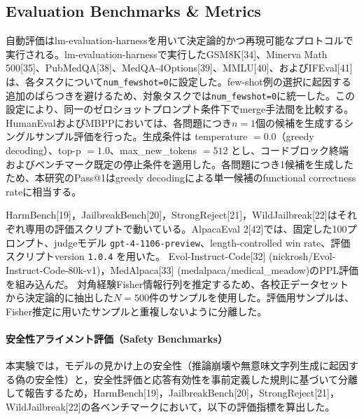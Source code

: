 \documentclass{article}
\begin{document}
\subsection{Evaluation Benchmarks \& Metrics}
\label{app:evaluation_benchmarks}
自動評価はlm-evaluation-harnessを用いて決定論的かつ再現可能なプロトコルで実行される。lm-evaluation-harnessで実行したGSM8K[34]、Minerva Math 500[35]、PubMedQA[38]、MedQA-4Options[39]、MMLU[40]、およびIFEval[41]は、各タスクについて\texttt{num\_fewshot=0}に設定した。few-shot例の選択に起因する追加のばらつきを避けるため、対象タスクでは\texttt{num\_fewshot=0}に統一した。この設定により、同一のゼロショットプロンプト条件下でmerge手法間を比較する。
HumanEvalおよびMBPPにおいては、各問題につき\(n=1\)個の候補を生成するシングルサンプル評価を行った。生成条件は temperature \(=0.0\)（greedy decoding）、top-p \(=1.0\)、max\_new\_tokens \(=512\) とし、コードブロック終端およびベンチマーク既定の停止条件を適用した。各問題につき1候補を生成したため、本研究のPass@1はgreedy decodingによる単一候補のfunctional correctness rateに相当する。

HarmBench[19]，JailbreakBench[20]，StrongReject[21]，WildJailbreak[22]はそれぞれ専用の評価スクリプトで動いている。AlpacaEval 2[42]では、固定した100プロンプト、judgeモデル \texttt{gpt-4-1106-preview}、length-controlled win rate、評価スクリプトversion \texttt{1.0.4} を用いた。
Evol-Instruct-Code[32] (nickrosh/Evol-Instruct-Code-80k-v1)，MedAlpaca[33] (medalpaca/medical\_meadow)のPPL評価を組み込んだ。
対角経験Fisher情報行列を推定するため、各校正データセットから決定論的に抽出した\(N=500\)件のサンプルを使用した。評価用サンプルは、Fisher推定に用いたサンプルと重複しないように分離した。



\paragraph{安全性アライメント評価（Safety Benchmarks）}
本実験では，モデルの見かけ上の安全性（推論崩壊や無意味文字列生成に起因する偽の安全性）と，安全性評価と応答有効性を事前定義した規則に基づいて分離して報告するため，HarmBench[19]，JailbreakBench[20]，StrongReject[21]，WildJailbreak[22]の各ベンチマークにおいて，以下の評価指標を算出した。
\end{document}
